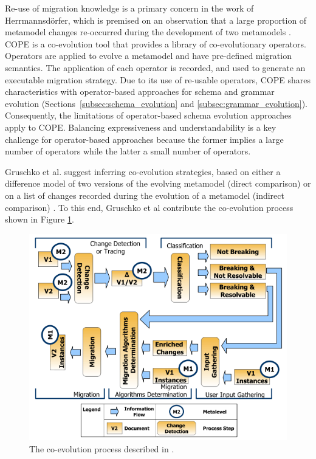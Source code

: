 Re-use \cc of migration knowledge is a primary concern in the work of Herrmannsd\"{o}rfer, which is premised on an observation that a large proportion of metamodel changes re-occurred during the development of two metamodels \cite{herrmannsdoerfer08automatability}. COPE \cc \cite{herrmannsdoerfer09cope} is a co-evolution tool that provides a library of co-evolutionary operators. Operators are applied to evolve a metamodel and have pre-defined migration semantics. The application of each operator is recorded, and used to generate an executable migration strategy. Due to its use of re-usable operators, COPE shares characteristics with operator-based approaches for schema and grammar evolution (Sections~\ref{subsec:schema_evolution} and \ref{subsec:grammar_evolution}). Consequently, the limitations of operator-based schema evolution approaches \cite{lerner00model} apply to COPE. Balancing expressiveness and understandability is a key challenge for operator-based approaches because the former implies a large number of operators while the latter a small number of operators.

Gruschko et al. suggest inferring co-evolution strategies, based on either a difference model of two versions of the evolving metamodel (direct comparison) or on a list of changes recorded during the evolution of a metamodel (indirect comparison) \cite{gruschko07towards}. To this end, Gruschko et al contribute the co-evolution process shown in Figure \ref{fig:coevoprocess}. 

\begin{figure}[htbp]
  \begin{center}
    \leavevmode
    \includegraphics[scale=0.6]{3.LiteratureReview/images/CoEvoProcess.png}
  \end{center}
  \caption[An exemplar co-evolution process]{The co-evolution process described in \cite{gruschko07towards}.}
  \label{fig:coevoprocess}
\end{figure}


